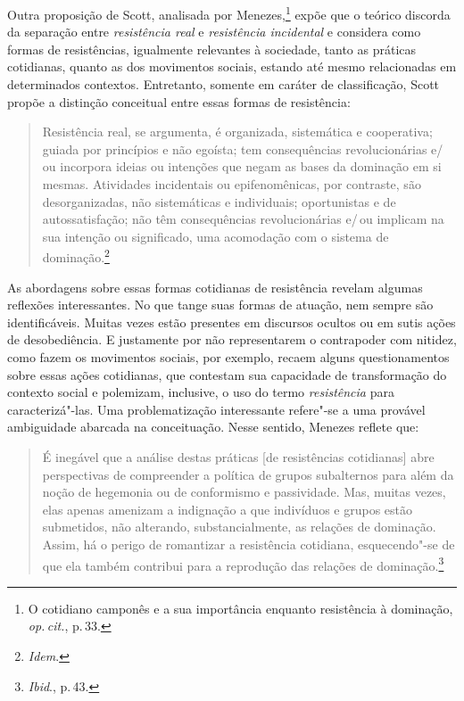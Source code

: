 Outra proposição de Scott, analisada por Menezes,\footnote{O cotidiano camponês e a sua importância enquanto resistência à dominação, \textit{op.\,cit.}, p.\,33.} expõe que o
teórico discorda da separação entre \textit{resistência real} e \textit{resistência
incidental} e considera como formas de resistências, igualmente
relevantes à sociedade, tanto as práticas cotidianas, quanto as dos
movimentos sociais, estando até mesmo relacionadas em determinados
contextos. Entretanto, somente em caráter de classificação, Scott propõe a distinção conceitual entre essas
formas de resistência:

\begin{quote}
Resistência real, se argumenta, é organizada, sistemática e
cooperativa; guiada por princípios e não egoísta; tem
consequências revolucionárias e/\,ou incorpora ideias ou intenções
que negam as bases da dominação em si mesmas. Atividades incidentais ou
epifenomênicas, por contraste, são desorganizadas, não sistemáticas
e individuais; oportunistas e de autossatisfação; não têm
consequências revolucionárias e/\,ou implicam na sua intenção ou
significado, uma acomodação com o sistema de dominação.\footnote{\textit{Idem}.}
\end{quote}

As abordagens sobre essas formas cotidianas de resistência revelam
algumas reflexões interessantes. No que tange suas formas de atuação,
nem sempre são identificáveis. Muitas vezes estão presentes em discursos
ocultos ou em sutis ações de desobediência. E justamente por não
representarem o contrapoder com nitidez, como fazem os movimentos
sociais, por exemplo, recaem alguns questionamentos sobre essas ações
cotidianas, que contestam sua capacidade de transformação do contexto
social e polemizam, inclusive, o uso do termo \textit{resistência} para
caracterizá"-las. Uma problematização interessante refere"-se a uma
provável ambiguidade abarcada na conceituação. Nesse sentido, Menezes
reflete que:

\begin{quote}
É inegável que a análise destas práticas {[}de resistências
cotidianas{]} abre perspectivas de compreender a política de grupos
subalternos para além da noção de hegemonia ou de conformismo e
passividade. Mas, muitas vezes, elas apenas amenizam a indignação a que
indivíduos e grupos estão submetidos, não alterando, substancialmente,
as relações de dominação. Assim, há o perigo de romantizar a resistência
cotidiana, esquecendo"-se de que ela também contribui para a reprodução
das relações de dominação.\footnote{\textit{Ibid}., p.\,43.}
\end{quote}

